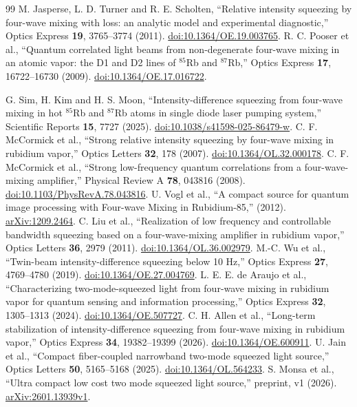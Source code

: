 \documentclass[11pt,a4paper]{article}
\begin{document}
\begin{thebibliography}{99}\small
{} M. Jasperse, L. D. Turner and R. E. Scholten,
``Relative intensity squeezing by four-wave mixing with loss: an analytic model and experimental diagnostic,''
Optics Express \textbf{19}, 3765--3774 (2011).
\href{https://doi.org/10.1364/OE.19.003765}{doi:10.1364/OE.19.003765}.
 R. C. Pooser et al., ``Quantum correlated light beams from non-degenerate
four-wave mixing in an atomic vapor: the D1 and D2 lines of $^{85}$Rb and $^{87}$Rb,''
Optics Express \textbf{17}, 16722--16730 (2009).
\href{https://doi.org/10.1364/OE.17.016722}{doi:10.1364/OE.17.016722}.

 G. Sim, H. Kim and H. S. Moon, ``Intensity-difference squeezing from four-wave mixing
in hot $^{85}$Rb and $^{87}$Rb atoms in single diode laser pumping system,''
Scientific Reports \textbf{15}, 7727 (2025).
\href{https://doi.org/10.1038/s41598-025-86479-w}{doi:10.1038/s41598-025-86479-w}.
 C. F. McCormick et al., ``Strong relative intensity squeezing
by four-wave mixing in rubidium vapor,'' Optics Letters \textbf{32}, 178 (2007).
\href{https://doi.org/10.1364/OL.32.000178}{doi:10.1364/OL.32.000178}.
 C. F. McCormick et al., ``Strong low-frequency quantum correlations
from a four-wave-mixing amplifier,'' Physical Review A \textbf{78}, 043816 (2008).
\href{https://doi.org/10.1103/PhysRevA.78.043816}{doi:10.1103/PhysRevA.78.043816}.
 U. Vogl et al., ``A compact source for quantum image processing
with Four-wave Mixing in Rubidium-85,'' (2012).
\href{https://arxiv.org/abs/1209.2464}{arXiv:1209.2464}.
 C. Liu et al., ``Realization of low frequency and controllable
bandwidth squeezing based on a four-wave-mixing amplifier in rubidium vapor,''
Optics Letters \textbf{36}, 2979 (2011).
\href{https://doi.org/10.1364/OL.36.002979}{doi:10.1364/OL.36.002979}.
 M.-C. Wu et al., ``Twin-beam intensity-difference squeezing below
10 Hz,'' Optics Express \textbf{27}, 4769--4780 (2019).
\href{https://doi.org/10.1364/OE.27.004769}{doi:10.1364/OE.27.004769}.
 L. E. E. de Araujo et al., ``Characterizing two-mode-squeezed
light from four-wave mixing in rubidium vapor for quantum sensing and information
processing,'' Optics Express \textbf{32}, 1305--1313 (2024).
\href{https://doi.org/10.1364/OE.507727}{doi:10.1364/OE.507727}.
 C. H. Allen et al., ``Long-term stabilization of intensity-difference
squeezing from four-wave mixing in rubidium vapor,'' Optics Express \textbf{34}, 19382--19399 (2026).
\href{https://doi.org/10.1364/OE.600911}{doi:10.1364/OE.600911}.
 U. Jain et al., ``Compact fiber-coupled narrowband two-mode
squeezed light source,'' Optics Letters \textbf{50}, 5165--5168 (2025).
\href{https://doi.org/10.1364/OL.564233}{doi:10.1364/OL.564233}.
 S. Monsa et al., ``Ultra compact low cost two mode squeezed light
source,'' preprint, v1 (2026).
\href{https://arxiv.org/abs/2601.13939v1}{arXiv:2601.13939v1}.
\end{thebibliography}
\end{document}
